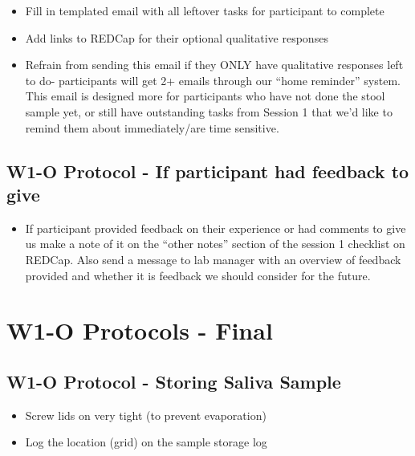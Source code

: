 \documentclass[]{book}
\providecommand{\tightlist}{%
  \setlength{\itemsep}{0pt}\setlength{\parskip}{0pt}}
\begin{document}
\begin{itemize}
\tightlist
\item
  Fill in templated email with all leftover tasks for participant to complete
\item
  Add links to REDCap for their optional qualitative responses
\item
  Refrain from sending this email if they ONLY have qualitative responses left to do- participants will get 2+ emails through our ``home reminder'' system. This email is designed more for participants who have not done the stool sample yet, or still have outstanding tasks from Session 1 that we'd like to remind them about immediately/are time sensitive.
\end{itemize}

\hypertarget{w1-o-protocol---if-participant-had-feedback-to-give}{%
\subsection{W1-O Protocol - If participant had feedback to give}\label{w1-o-protocol---if-participant-had-feedback-to-give}}

\begin{itemize}
\tightlist
\item
  If participant provided feedback on their experience or had comments to give us make a note of it on the ``other notes'' section of the session 1 checklist on REDCap. Also send a message to lab manager with an overview of feedback provided and whether it is feedback we should consider for the future.
\end{itemize}

\hypertarget{w1-o-protocols---final}{%
\section{W1-O Protocols - Final}\label{w1-o-protocols---final}}

\hypertarget{w1-o-protocol---storing-saliva-sample}{%
\subsection{W1-O Protocol - Storing Saliva Sample}\label{w1-o-protocol---storing-saliva-sample}}

\begin{itemize}
\tightlist
\item
  Screw lids on very tight (to prevent evaporation)
\item
  Log the location (grid) on the sample storage log
\end{itemize}
\end{document}
